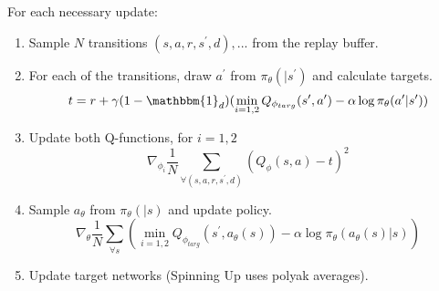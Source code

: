 \noindent For each necessary update:
\begin{enumerate}
    \item Sample $N$ transitions ${(s, a, r, s^\prime, d), ... }$ from the replay buffer.
    \item For each of the transitions, draw $a^\prime$ from $\pi_\theta(|s^\prime)$ and calculate targets.
    \[ t = r + \gamma (1 - \mathbbm{1}_d) ( \min_{i = 1, 2} Q_{\phi_{targ}}(s^\prime, a^\prime) -\alpha \log \pi_\theta(a^\prime|s^\prime))\]
    \item Update both Q-functions, for $i = 1, 2$
    \[ \nabla_{\phi_i} \frac{1}{N} \sum_{\forall(s, a, r, s^\prime, d)} (Q_{\phi}(s, a) - t)^2\]
    \item Sample $a_\theta$ from $\pi_\theta(|s)$ and update policy.
    \[ \nabla_{\theta} \frac{1}{N} \sum_{\forall s} ( \min_{i = 1, 2} Q_{\phi_{targ}}(s^\prime, a_\theta(s)) -\alpha \log \pi_\theta(a_\theta(s)|s))\]
    \item Update target networks (Spinning Up uses polyak averages).
\end{enumerate}